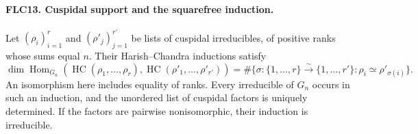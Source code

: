 \paragraph{FLC13. Cuspidal support and the squarefree induction.}
\label{claim:FLC13}
Let $(\rho_i)_{i=1}^r$ and $(\rho'_j)_{j=1}^{r'}$ be lists
of cuspidal irreducibles, of positive ranks whose sums equal
$n$.  Their Harish--Chandra inductions satisfy
\[
 \dim\operatorname{Hom}_{G_n}
       (\operatorname{HC}(\rho_1,\ldots,\rho_r),
        \operatorname{HC}(\rho'_1,\ldots,\rho'_{r'}))
   =\#\{\sigma:\{1,\ldots,r\}\xrightarrow{\sim}
                       \{1,\ldots,r'\}:\rho_i\simeq\rho'_{\sigma(i)}\}.
 \tag{FLC.19}
\]
An isomorphism here includes equality of ranks.
Every irreducible of $G_n$ occurs in such an induction, and
the unordered list of cuspidal factors is uniquely determined.
If the factors are pairwise nonisomorphic, their induction
is irreducible.
